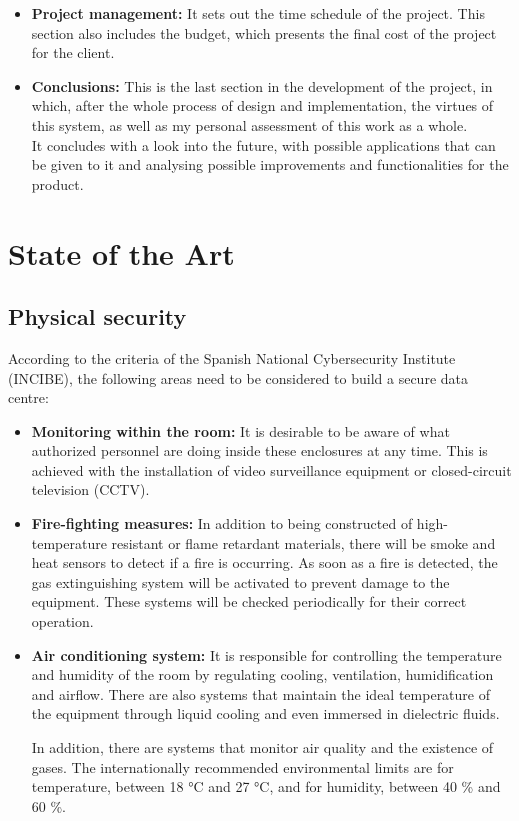 \begin{itemize}
	\item \textbf{Project management:} It sets out the time schedule of the project. This section also includes the budget, which presents the final cost of the project for the client.
	\item \textbf{Conclusions:} This is the last section in the development of the project, in which, after the whole process of design and implementation, the virtues of this system, as well as my personal assessment of this work as a whole. \\ It concludes with a look into the future, with possible applications that can be given to it and analysing possible improvements and functionalities for the product.
\end{itemize}
\pagebreak

\section{State of the Art}\label{sec:state-of-the-art}
\subsection{Physical security}\label{subsec:physical-security}
According to the criteria of the Spanish National Cybersecurity Institute (INCIBE), the following areas need to be considered to build a secure data centre:
\begin{itemize}
	\item \textbf{Monitoring within the room:} It is desirable to be aware of what authorized personnel are doing inside these enclosures at any time. This is achieved with the installation of video surveillance equipment or closed-circuit television (CCTV).
	\item \textbf{Fire-fighting measures:} In addition to being constructed of high-temperature resistant or flame retardant materials, there will be smoke and heat sensors to detect if a fire is occurring. As soon as a fire is detected, the gas extinguishing system will be activated to prevent damage to the equipment. These systems will be checked periodically for their correct operation.
	\item \textbf{Air conditioning system:} It is responsible for controlling the temperature and humidity of the room by regulating cooling, ventilation, humidification and airflow. There are also systems that maintain the ideal temperature of the equipment through liquid cooling and even immersed in dielectric fluids.

	In addition, there are systems that monitor air quality and the existence of gases. The internationally recommended environmental limits are for temperature, between 18 °C and 27 °C, and for humidity, between 40 \% and 60 \%.
\end{itemize}

